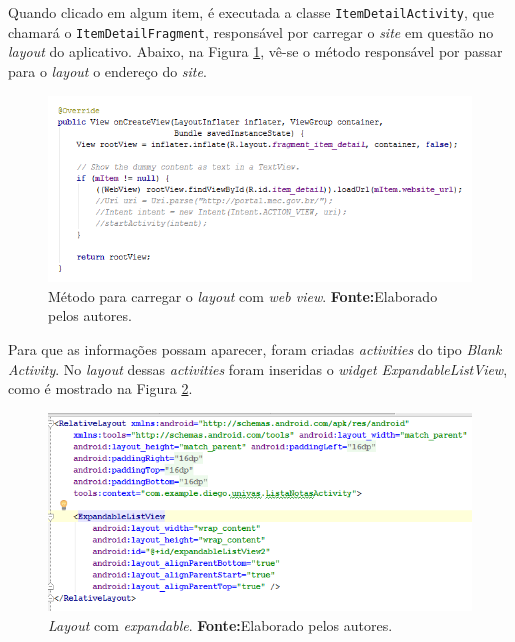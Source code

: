 	\par Quando clicado em algum item, é executada a classe
\texttt{ItemDetailActivity}, que chamará o \texttt{ItemDetailFragment},
responsável por carregar o \textit{site} em questão no \textit{layout} do
aplicativo. Abaixo, na Figura \ref{fig:qm6}, vê-se o método responsável por
passar para o \textit{layout} o endereço do \textit{site}.
				
		\begin{figure}[h!]
			\centerline{\includegraphics[scale=0.4]{./imagens/2_q_metodologico/qm6.png}}
			\caption[Método para carregar o \textit{layout} com \textit{web
			view}]{Método para carregar o \textit{layout} com \textit{web
			view}.
			 \textbf{Fonte:}Elaborado pelos autores.}
			\label{fig:qm6}
		\end{figure}

	\par Para que as informações possam aparecer, foram criadas
\textit{activities} do tipo \textit{Blank Activity}. No \textit{layout} dessas
\textit{activities} foram inseridas o \textit{widget ExpandableListView}, como
	é mostrado na Figura \ref{fig:qm7}.
	

		\begin{figure}[h!]
			\centerline{\includegraphics[scale=0.4]{./imagens/2_q_metodologico/qm7.png}}
			\caption[\textit{Layout} com \textit{expandable}]{\textit{Layout} com
			\textit{expandable}.
			 \textbf{Fonte:}Elaborado pelos autores.}
			\label{fig:qm7}
		\end{figure}		
		
